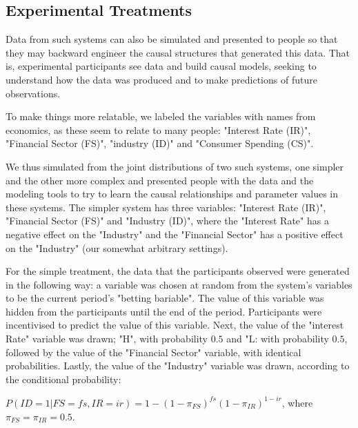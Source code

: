 \subsection{Experimental Treatments}

Data from such systems can also be simulated and presented to people so that they may backward engineer the causal structures that generated this data. That is, experimental participants see data and build causal models, seeking to understand how the data was produced and to make predictions of future observations. 

To make things more relatable, we labeled the variables with names from economics, as these seem to relate to many people: "Interest Rate (IR)", "Financial Sector (FS)", "industry (ID)" and "Consumer Spending (CS)". 


We thus simulated from the joint distributions of two such systems, one simpler and the other more complex and presented people with the data and the modeling tools to try to learn the causal relationships and parameter values in these systems. The simpler system has three variables: "Interest Rate (IR)", "Financial Sector (FS)" and "Industry (ID)", where the "Interest Rate" has a negative effect on the "Industry" and the "Financial Sector" has a positive effect on the "Industry" (our somewhat arbitrary settings).

For the simple treatment, the data that the participants observed were generated in the following way: a variable was chosen at random from the system's variables to be the current period's "betting bariable". The value of this variable was hidden from the participants until the end of the period. Participants were incentivised to predict the value of this variable. Next, the value of the "interest Rate" variable was drawn; "H", with probability $0.5$ and "L: with probability $0.5$, followed by the value of the "Financial Sector" variable, with identical probabilities. Lastly, the value of the "Industry" variable was drawn, according to the conditional probability:  

$P(ID=1|FS=fs, IR=ir) = 1-(1-\pi_{FS})^{fs}(1-\pi_{IR})^{1-ir}$, where $\pi_{FS}=\pi_{IR}=0.5$. 

